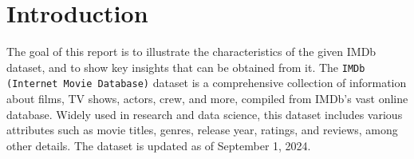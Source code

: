\section*{Introduction}
The goal of this report is to illustrate the characteristics of the
given IMDb dataset, and to show key insights that can be
obtained from it.
The \texttt{IMDb (Internet Movie Database)} 
dataset is a comprehensive collection of information about films, TV shows, actors, crew, 
and more, compiled from IMDb's vast online database. Widely used in research and data science, 
this dataset includes various attributes such as movie titles, genres, release year, ratings, 
and reviews, among other details. The dataset is updated as of September 1, 2024.


